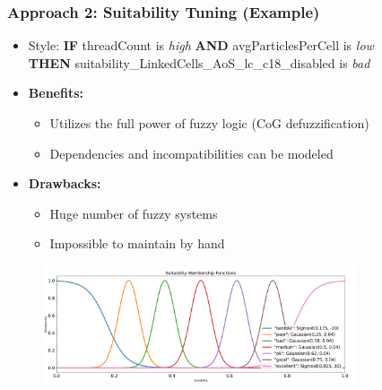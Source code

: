 \documentclass[
	10pt,
	t		%
]{beamer}
\begin{document}
\begin{frame}
	\frametitle{Approach 2: Suitability Tuning (Example)}
	\begin{itemize}
		\item Style: {\small
		      \textbf{IF} threadCount is \textit{high} \textbf{AND} avgParticlesPerCell is \textit{low}\\ \qquad \qquad \quad \textbf{THEN} suitability\_LinkedCells\_AoS\_lc\_c18\_disabled is \textit{bad}}
		      
		\item \textbf{Benefits:}
		      \begin{itemize}
			      \item Utilizes the full power of fuzzy logic (CoG defuzzification)
			      \item Dependencies and incompatibilities can be modeled
		      \end{itemize}
		\item \textbf{Drawbacks:}
		      \begin{itemize}
			      \item Huge number of fuzzy systems
			      \item Impossible to maintain by hand
		      \end{itemize}
	\end{itemize}
	
	\begin{figure}
		\centering
		\includegraphics[width=0.82\textwidth,trim={0 0 0 1.8cm},clip]{figures/suitability-linguistic-variable.png}
	\end{figure}
	
\end{frame}
\end{document}

